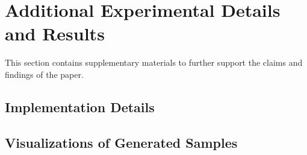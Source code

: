 \documentclass{article}
\begin{document}


\appendix
\section{Additional Experimental Details and Results}
\label{app:additional_results}
This section contains supplementary materials to further support the claims and findings of the paper.

\subsection{Implementation Details}

\subsection{Visualizations of Generated Samples}
\end{document}
